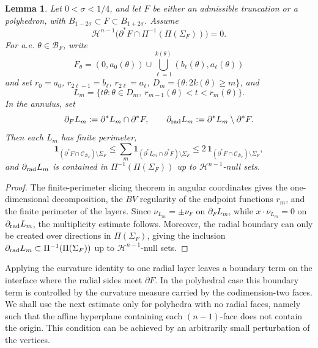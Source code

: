 \documentclass[reqno,11pt]{amsart}
\makeatletter
\def\sz{\sigma}
\newcommand{\HH}{\mathscr H}
\newtheorem{lem}[thm]{Lemma}%
\numberwithin{equation}{section}
\theoremstyle{remark}
\makeatother
\begin{document}
\begin{lem}\label{lem:radial-layer-package}
Let $0<\sz<1/4$, and let $F$ be either an admissible truncation or a polyhedron,
with
$B_{1-2\sz}\subset F\subset B_{1+2\sz}$. Assume
\[
\HH^{n-1}\bigl(\partial^*F\cap\Pi^{-1}(\Pi(\Sigma_F))\bigr)=0.
\]
For a.e. $\theta\in\mathcal B_F$, write
\[
F_\theta=(0,a_0(\theta))\cup
\bigcup_{\ell=1}^{k(\theta)}(b_\ell(\theta),a_\ell(\theta))
\]
and set $r_0=a_0$, $r_{2\ell-1}=b_\ell$, $r_{2\ell}=a_\ell$,
$D_m=\{\theta:2k(\theta)\ge m\}$, and
$$L_m=\{t\theta:\theta\in D_m,\ r_{m-1}(\theta)<t<r_m(\theta)\}.$$
In the annulus, set
\[
\partial_F L_m:=\partial^*L_m\cap\partial^*F,
\qquad
\partial_{\rm rad}L_m:=\partial^*L_m\setminus\partial^*F.
\]
Then each $L_m$ has finite perimeter,
\[
\mathbf 1_{(\partial^*F\cap\mathcal C_{\mathcal B_F})\setminus\Sigma_F}
\le
\sum_m\mathbf 1_{(\partial^*L_m\cap\partial^*F)\setminus\Sigma_F}
\le
2\,\mathbf 1_{(\partial^*F\cap\mathcal C_{\mathcal B_F})\setminus\Sigma_F},
\]
and $\partial_{\rm rad}L_m$ is contained in $\Pi^{-1}(\Pi(\Sigma_F))$ up to
$\HH^{n-1}$-null sets.
\end{lem}

\begin{proof}
The finite-perimeter slicing theorem in angular coordinates
\cite[Theorems B, D, E and G]{CCF2005} gives the one-dimensional
decomposition, the $BV$ regularity of the endpoint functions $r_m$, and the
finite perimeter of the layers. Since $\nu_{L_m}=\pm\nu_F$ on
$\partial_F L_m$, while $x\cdot\nu_{L_m}=0$ on $\partial_{\rm rad}L_m$, the
multiplicity estimate follows. Moreover, the radial boundary can only be
created over directions in $\Pi(\Sigma_F)$, giving the inclusion
$\partial_{\rm rad}L_m\subset\Pi^{-1}(\Pi(\Sigma_F))$ up to
$\HH^{n-1}$-null sets.
\end{proof}

Applying the curvature identity to one radial layer leaves a boundary term on
the interface where the radial sides meet $\partial F$. In the polyhedral case
this boundary term is controlled by the curvature measure carried by the
codimension-two faces.
We shall use the next estimate only for polyhedra with no radial faces, namely
such that the affine hyperplane containing each $(n-1)$-face does not contain
the origin. This condition can be achieved by an arbitrarily small perturbation of
the vertices.
\end{document}
